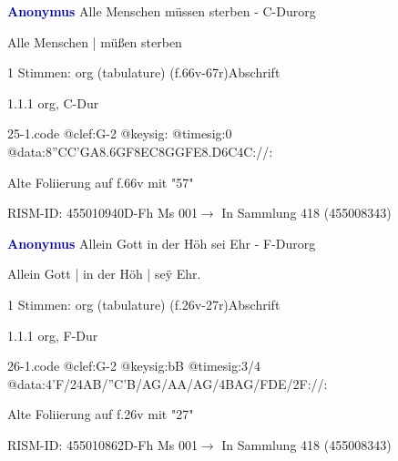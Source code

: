 \documentclass[twocolumn, 12pt]{book}
\begin{document}
\par \vspace{16pt} \textcolor{darkblue}{\textbf{Anonymus  }}\hfillplus{\textbf{[25]}}\newline Alle Menschen müssen sterben - C-Dur\newline org
\par \begin{itshape}[f.66v, at left:] Alle Menschen | müßen sterben\end{itshape} 
\par \textcolor{darkblue}{}  1 Stimmen: org (tabulature)  (f.66v-67r)\newline Abschrift
\par 1.1.1  org, C-Dur  
\begin{filecontents*}{25-1.code}
@clef:G-2
@keysig:
@timesig:0
@data:{8''CC'GA}{8.6GF8EC}{8GGFE}{8.D6C}4C://:
\end{filecontents*}
\newline %
\par Alte Foliierung auf f.66v mit "57"
\par RISM-ID: 455010940\newline D-Fh  Ms 001\newline $\rightarrow$ In Sammlung 418 (455008343)
      
\par \vspace{16pt} \textcolor{darkblue}{\textbf{Anonymus  }}\hfillplus{\textbf{[26]}}\newline Allein Gott in der Höh sei Ehr - F-Dur\newline org
\par \begin{itshape}[f.26v, at left:] Allein Gott | in der Höh | seÿ Ehr.\end{itshape} 
\par \textcolor{darkblue}{}  1 Stimmen: org (tabulature)  (f.26v-27r)\newline Abschrift
\par 1.1.1  org, F-Dur  
\begin{filecontents*}{26-1.code}
@clef:G-2
@keysig:bB
@timesig:3/4
@data:4'F/24AB/''C'B/AG/AA/AG/4BAG/FDE/2F://:
\end{filecontents*}
\newline %
\par Alte Foliierung auf f.26v mit "27"
\par RISM-ID: 455010862\newline D-Fh  Ms 001\newline $\rightarrow$ In Sammlung 418 (455008343)
      
\end{document}
